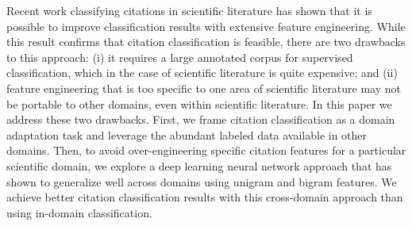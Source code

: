 Recent work classifying citations in scientific literature has shown that it is possible to improve classification results with extensive feature engineering.  While this result confirms that citation classification is feasible, there are two drawbacks to this approach: (i) it requires a large annotated corpus for supervised classification, which in the case of scientific literature is quite expensive; and (ii) feature engineering that is too specific to one area of scientific literature may not be portable to other domains, even within scientific literature.  In this paper we address these two drawbacks.                    First, we frame citation classification as a domain adaptation task and leverage the abundant labeled data available in other domains.                    Then, to avoid over-engineering specific citation features for a particular scientific domain, we explore a deep learning neural network approach that has shown to generalize well across domains using unigram and bigram features.  We achieve better citation classification results with this cross-domain approach than using in-domain classification.
